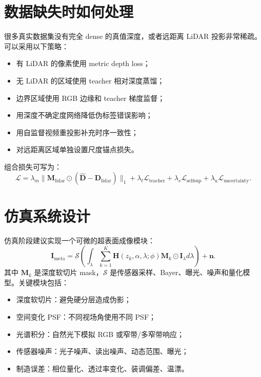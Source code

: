 \documentclass[11pt,a4paper,fontset=none]{ctexart}
\begin{document}
\section{数据缺失时如何处理}

很多真实数据集没有完全 dense 的真值深度，或者远距离 LiDAR 投影非常稀疏。可以采用以下策略：

\begin{itemize}
  \item 有 LiDAR 的像素使用 metric depth loss；
  \item 无 LiDAR 的区域使用 teacher 相对深度蒸馏；
  \item 边界区域使用 RGB 边缘和 teacher 梯度监督；
  \item 用深度不确定度网络降低伪标签错误影响；
  \item 用自监督视频重投影补充时序一致性；
  \item 对远距离区域单独设置尺度锚点损失。
\end{itemize}

组合损失可写为：
\begin{equation}
  \mathcal L =
  \lambda_m
  \| \bm M_{\mathrm{lidar}}\odot(\hat{\bm D}-\bm D_{\mathrm{lidar}})\|_1
  +
  \lambda_t
  \mathcal L_{\mathrm{teacher}}
  +
  \lambda_s
  \mathcal L_{\mathrm{selfsup}}
  +
  \lambda_u
  \mathcal L_{\mathrm{uncertainty}}.
\end{equation}

\section{仿真系统设计}

仿真阶段建议实现一个可微的超表面成像模块：
\begin{equation}
  \bm I_{\mathrm{meta}}
  =
  \mathcal S
  \left(
  \int_\lambda
  \sum_{k=1}^{K}
  \bm H(z_k,\alpha,\lambda;\phi)
  \bm M_k \odot \bm I_\lambda
  d\lambda
  \right)
  + \bm n.
\end{equation}
其中 $\bm M_k$ 是深度软切片 mask，$\mathcal S$ 是传感器采样、Bayer、曝光、噪声和量化模型。关键模块包括：
\begin{itemize}
  \item 深度软切片：避免硬分层造成伪影；
  \item 空间变化 PSF：不同视场角使用不同 PSF；
  \item 光谱积分：自然光下模拟 RGB 或窄带/多窄带响应；
  \item 传感器噪声：光子噪声、读出噪声、动态范围、曝光；
  \item 制造误差：相位量化、透过率变化、装调偏差、温漂。
\end{itemize}
\end{document}
